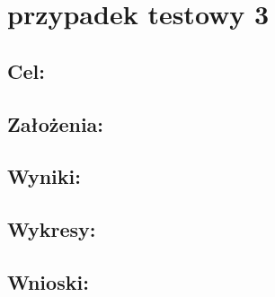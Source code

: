 \section{przypadek testowy 3}
\subsection{Cel: }
\subsection{Założenia: }
\subsection{Wyniki: }
\subsection{Wykresy: }
\subsection{Wnioski: }

